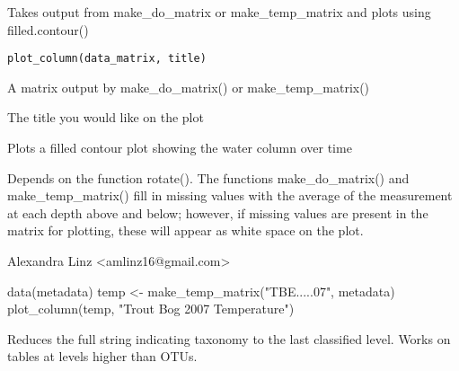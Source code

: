 \documentclass[a4paper]{book}
\begin{document}
%
\begin{Description}\relax
Takes output from make\_do\_matrix or make\_temp\_matrix and plots using filled.contour()
\end{Description}
%
\begin{Usage}
\begin{verbatim}
plot_column(data_matrix, title)
\end{verbatim}
\end{Usage}
%
\begin{Arguments}
\begin{ldescription}
\item[\code{data\_matrix}] 
A matrix output by make\_do\_matrix() or make\_temp\_matrix()

\item[\code{title}] 
The title you would like on the plot

\end{ldescription}
\end{Arguments}
%
\begin{Value}
Plots a filled contour plot showing the water column over time
\end{Value}
%
\begin{Note}\relax
Depends on the function rotate(). The functions make\_do\_matrix() and make\_temp\_matrix() fill in missing values with the average of the measurement at each depth above and below; however, if missing values are present in the matrix for plotting, these will appear as white space on the plot.
\end{Note}
%
\begin{Author}\relax
Alexandra Linz <amlinz16@gmail.com>
\end{Author}
%
\begin{Examples}
\begin{ExampleCode}
data(metadata)
temp <- make_temp_matrix("TBE.....07", metadata)
plot_column(temp, "Trout Bog 2007 Temperature")
\end{ExampleCode}
\end{Examples}
%
\begin{Description}\relax
Reduces the full string indicating taxonomy to the last classified level. Works on tables at levels higher than OTUs.
\end{Description}
\end{document}
